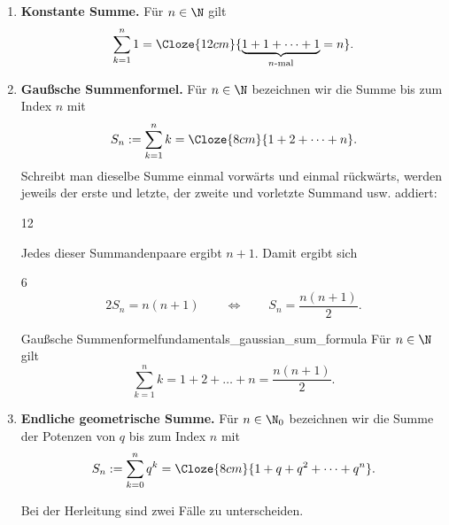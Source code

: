 \begin{enumerate}[label=\textbf{\arabic*.},leftmargin=2.3em,itemsep=1.2em]
  \item \textbf{Konstante Summe.}
    Für $n\in\N$ gilt
    \[
      \sum_{k=1}^{n}1
        =\Cloze{12cm}{\underbrace{1+1+\dots+1}_{n\text{-mal}}=n}.
    \]

  \item
    \begin{minipage}[t]{\linewidth}
      \textbf{Gaußsche Summenformel.}
      Für $n\in\N$ bezeichnen wir die Summe bis zum Index $n$ mit
      \[
        S_n:=\sum_{k=1}^{n}k=\Cloze{8cm}{1+2+\dots+n}.
      \]
      Schreibt man dieselbe Summe einmal vorwärts und einmal rückwärts, werden
      jeweils der erste und letzte, der zweite und vorletzte Summand usw.
      addiert:
      \begin{ClozeArea}[33]{12}
        \centering
      \end{ClozeArea}
    \end{minipage}

    Jedes dieser Summandenpaare ergibt $n+1$. Damit ergibt sich
    \begin{ClozeArea}[33]{6}
      \[
        2S_n = n(n+1)
        \qquad \Longleftrightarrow \qquad
        S_n = \frac{n(n+1)}{2}.
      \]
    \end{ClozeArea}
    

    \begin{TheoremBox}{Gaußsche Summenformel}{fundamentals_gaussian_sum_formula}
      Für $n\in\N$ gilt
      \[
        \sum_{k=1}^{n}k=1+2+\dots+n=\frac{n(n+1)}{2}.
      \]
    \end{TheoremBox}

  \item
    \begin{minipage}[t]{\linewidth}
      \textbf{Endliche geometrische Summe.}
      Für $n\in\N_0$ bezeichnen wir die Summe der Potenzen von $q$ bis zum
      Index $n$ mit
      \[
        S_n:=\sum_{k=0}^{n}q^k=\Cloze{8cm}{1+q+q^2+\dots+q^n}.
      \]
    \end{minipage}

    \begin{minipage}{\linewidth}
      Bei der Herleitung sind zwei Fälle zu unterscheiden. \\


\end{minipage}
\end{enumerate}
